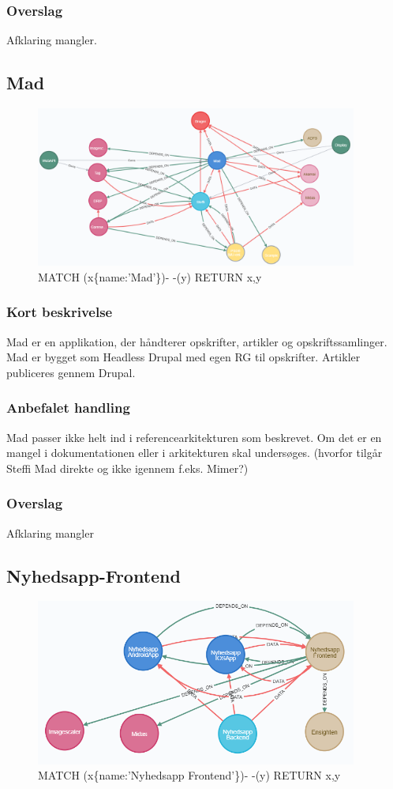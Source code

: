\documentclass{article}
\begin{document}
\subsubsection{Overslag}
Afklaring mangler.

\subsection{Mad}
\begin{figure}[h]
\includegraphics[width=300pt]{Mad.PNG}
\caption{MATCH (x\{name:'Mad'\})- -(y) RETURN x,y}
\end{figure}
\subsubsection{Kort beskrivelse}
Mad er en applikation, der håndterer opskrifter, artikler og opskriftssamlinger. Mad er bygget som Headless Drupal med egen RG til opskrifter. Artikler publiceres gennem Drupal. 
\subsubsection{Anbefalet handling}
Mad passer ikke helt ind i referencearkitekturen som beskrevet. Om det er en mangel i dokumentationen eller i arkitekturen skal undersøges. (hvorfor tilgår Steffi Mad direkte og ikke igennem f.eks. Mimer?)
\subsubsection{Overslag}
Afklaring mangler

\subsection{Nyhedsapp-Frontend}
\begin{figure}[h]
\includegraphics[width=300pt]{Nyhedsapp-Frontend.PNG}
\caption{MATCH (x\{name:'Nyhedsapp Frontend'\})- -(y) RETURN x,y}
\end{figure}
\end{document}
